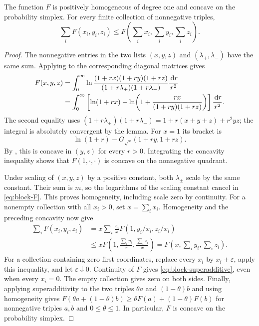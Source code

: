 \begin{lemma}\label{lem:scalar}
The function $F$ is positively homogeneous of degree one and concave
on the probability simplex. For every finite collection of nonnegative
triples,
\begin{equation}\label{eq:block-superadditive}
 \sum_i F(x_i,y_i,z_i)
 \le F\!\left(\sum_i x_i,\sum_i y_i,\sum_i z_i\right).
\end{equation}
\end{lemma}

\begin{proof}
The nonnegative entries in the two lists $(x,y,z)$ and
$(\lambda_+,\lambda_-)$ have the same sum. Applying
 to the corresponding diagonal matrices gives
\begin{align}
 F(x,y,z)
 &=\int_0^\infty
 \ln\frac{(1+rx)(1+ry)(1+rz)}
          {(1+r\lambda_+)(1+r\lambda_-)}\frac{\,\mathrm d r}{r^2}\notag\\
 &=\int_0^\infty\left[\ln(1+rx)
 -\ln\!\left(1+\frac{rx}{(1+ry)(1+rz)}\right)\right]
          \frac{\,\mathrm d r}{r^2}.
 \label{eq:scalar-deficit-integral}
\end{align}
The second equality uses
$(1+r\lambda_+)(1+r\lambda_-)=1+r(x+y+z)+r^2yz$;
the integral is absolutely convergent by the lemma.
For $x=1$ its bracket is
\[
 \ln(1+r)-G_{\sqrt r}(1+ry,1+rz).
\]
By , this is concave in $(y,z)$ for every $r>0$.
Integrating the concavity inequality shows that $F(1,\cdot,\cdot)$
is concave on the nonnegative quadrant.

Under scaling of $(x,y,z)$ by a positive constant, both
$\lambda_\pm$ scale by the same constant. Their sum is $m$, so the
logarithms of the scaling constant cancel in \eqref{eq:block-F}.
This proves homogeneity, including scale zero by continuity.
For a nonempty collection with all $x_i>0$, set $x=\sum_i x_i$.
Homogeneity and the preceding concavity now give
\begin{align*}
 \sum_iF(x_i,y_i,z_i)
 &=x\sum_i\frac{x_i}{x}F(1,y_i/x_i,z_i/x_i)\\
 &\le xF\!\left(1,\frac{\sum_i y_i}{x},
                     \frac{\sum_i z_i}{x}\right)
 =F\!\left(x,\sum_i y_i,\sum_i z_i\right).
\end{align*}
For a collection containing zero first coordinates, replace every
$x_i$ by $x_i+\varepsilon$, apply this inequality, and let
$\varepsilon\downarrow0$. Continuity of $F$ gives
\eqref{eq:block-superadditive}, even when every $x_i=0$.
The empty collection gives zero on both sides. Finally, applying
superadditivity to the two triples $\theta a$ and $(1-\theta)b$
and using homogeneity gives
$F(\theta a+(1-\theta)b)\ge\theta F(a)+(1-\theta)F(b)$
for nonnegative triples $a,b$ and $0\le\theta\le1$.
In particular, $F$ is concave on the probability simplex.
\end{proof}

